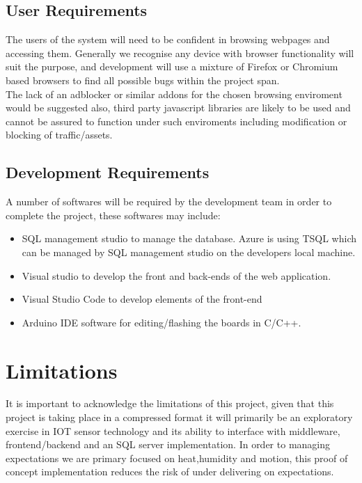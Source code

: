 \documentclass{article}
\begin{document}
        \subsection{User Requirements}
            The users of the system will need to be confident in browsing webpages and accessing them. Generally
            we recognise any device with browser functionality will suit the purpose, and development will use a 
            mixture of Firefox\cite{Firefox} or Chromium\cite{Chromium} based browsers to find all possible bugs 
            within the project span.
            \\
            The lack of an adblocker or similar addons for the chosen browsing enviroment would be suggested also,
            third party javascript libraries are likely to be used and cannot be assured to function under such 
            enviroments including modification or blocking of traffic/assets.
        
        \newpage

        \subsection{Development Requirements\cite{DevelopmentResources}}
            A number of softwares will be required by the development team in order to complete the project,
            these softwares may include:
            \begin{itemize}
                \item SQL management studio to manage the database. Azure is using TSQL which can be managed by SQL management studio 
                on the developers local machine.
                \item Visual studio to develop the front and back-ends of the web application. 
                \item Visual Studio Code to develop elements of the front-end
                \item Arduino IDE software for editing/flashing the boards in C/C++.
            \end{itemize}

        \newpage

    \section{Limitations}
        It is important to acknowledge the limitations of this project, given that this project is taking place 
        in a compressed format it will primarily be an exploratory exercise in IOT sensor technology and its 
        ability to interface with middleware, frontend/backend and an SQL server implementation.
        \vspace{10mm}
        In order to managing expectations we are primary focused on heat,humidity and motion, this proof of 
        concept implementation reduces the risk of under delivering on expectations.
        
\end{document}
